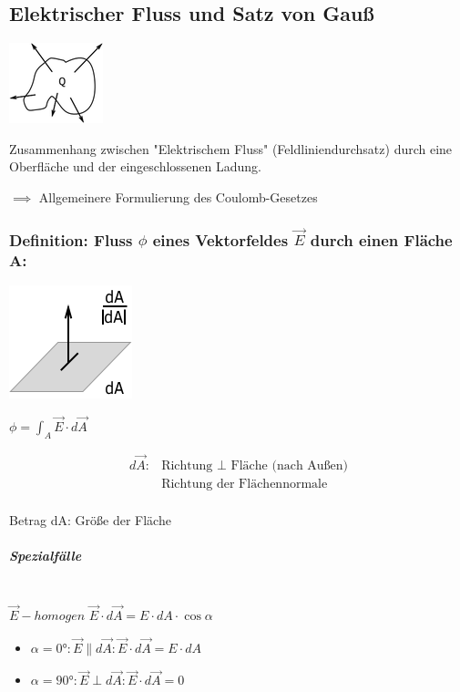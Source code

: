 \documentclass[11pt]{article}
\begin{document}
		
	
\subsection{Elektrischer Fluss und Satz von Gauß}

\includegraphics{skizzen/14/14_6B0}
		
Zusammenhang zwischen "Elektrischem Fluss" (Feldliniendurchsatz) durch eine Oberfläche und der eingeschlossenen Ladung.

$\implies$ Allgemeinere Formulierung des Coulomb-Gesetzes

\subsubsection{Definition: Fluss $\phi$ eines Vektorfeldes $\vec{E}$ durch einen Fläche A:}

\includegraphics{skizzen/14/14_6B1}


$\phi= \int_A \vec{E}\cdot d\vec{A}$

\begin{align*}
	d\vec{A}:&\text{Richtung }\perp \text{ Fläche (nach Außen)}\\
	&\text{Richtung der Flächennormale}
\end{align*}\\

Betrag dA: Größe der Fläche

\subparagraph{Spezialfälle}\\

$\vec{E}-homogen$
$\vec{E}\cdot d\vec{A}= E\cdot dA\cdot \cos\alpha$

\begin{itemize}
	\item $\alpha=0°: \vec{E}\parallel d\vec{A}: \vec{E}\cdot d\vec{A}=E\cdot dA$\\
	\item $\alpha=90°: \vec{E}\perp d\vec{A}: \vec{E}\cdot d\vec{A}=0$
\end{itemize}
\end{document}
